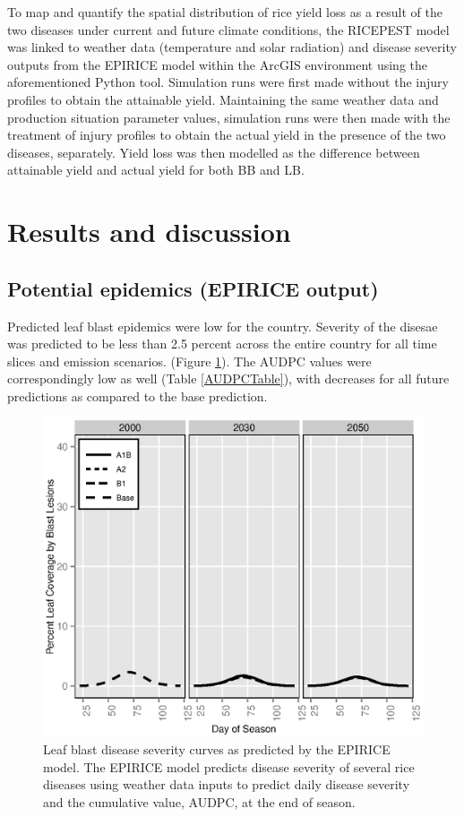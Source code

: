 \documentclass[preprint,12pt]{elsarticle}
\begin{document}
To map and quantify the spatial distribution of rice yield loss as a result of the two diseases under current and future climate conditions, the RICEPEST model was linked to weather data (temperature and solar radiation) and disease severity outputs from the EPIRICE model within the ArcGIS environment using the aforementioned Python tool. Simulation runs were first made without the injury profiles to obtain the attainable yield. Maintaining the same weather data and production situation parameter values, simulation runs were then made with the treatment of injury profiles to obtain the actual yield in the presence of the two diseases, separately. Yield loss was then modelled as the difference between attainable yield and actual yield for both BB and LB.

\section{Results and discussion}

\subsection{Potential epidemics (EPIRICE output)}
Predicted leaf blast epidemics were low for the country. Severity of the disesae was predicted to be less than 2.5 percent across the entire country for all time slices and emission scenarios. (Figure \ref{LBCurves}). The AUDPC values were correspondingly low as well (Table \ref{AUDPCTable}), with decreases for all future predictions as compared to the base prediction.

\begin{figure}[H]
  \includegraphics[width = 140mm]{figures/LB}
  \caption{Leaf blast disease severity curves as predicted by the EPIRICE model. The EPIRICE model predicts disease severity of several rice diseases using weather data inputs to predict daily disease severity and the cumulative value, AUDPC, at the end of season.}
    \label{LBCurves}
\end{figure}
\end{document}
